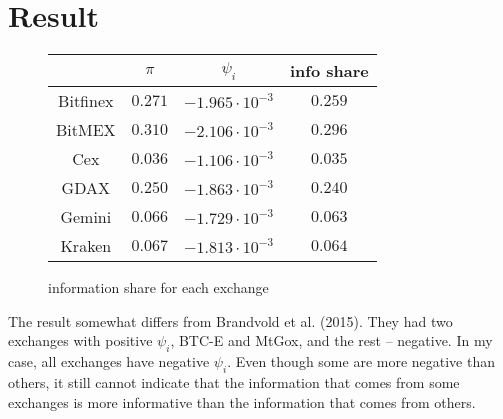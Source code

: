 \documentclass[a4paper,12pt]{article}
\newcommand{\E}{\mathrm{E}}
\begin{document}




  \section{Result}
    \begin{figure}[h]
      \centering
      \begin{tabular}{ c c c c }
        \hline
                 & $\pi$ & $\psi_i$ & info share \\
        \hline
        Bitfinex & $0.271$ & $-1.965\cdot 10^{-3}$ & $0.259$ \\
        BitMEX   & $0.310$ & $-2.106\cdot 10^{-3}$ & $0.296$ \\
        Cex      & $0.036$ & $-1.106\cdot 10^{-3}$ & $0.035$ \\
        GDAX     & $0.250$ & $-1.863\cdot 10^{-3}$ & $0.240$ \\
        Gemini   & $0.066$ & $-1.729\cdot 10^{-3}$ & $0.063$ \\
        Kraken   & $0.067$ & $-1.813\cdot 10^{-3}$ & $0.064$ \\
        \hline
      \end{tabular}
      \caption{information share for each exchange}
    \end{figure}

    The result somewhat differs from Brandvold et al. (2015). They had two exchanges with positive $\psi_i$, BTC-E and MtGox, and the rest -- negative. In my case, all exchanges have negative $\psi_i$. Even though some are more negative than others, it still cannot indicate that the information that comes from some exchanges is more informative than the information that comes from others.
\end{document}

